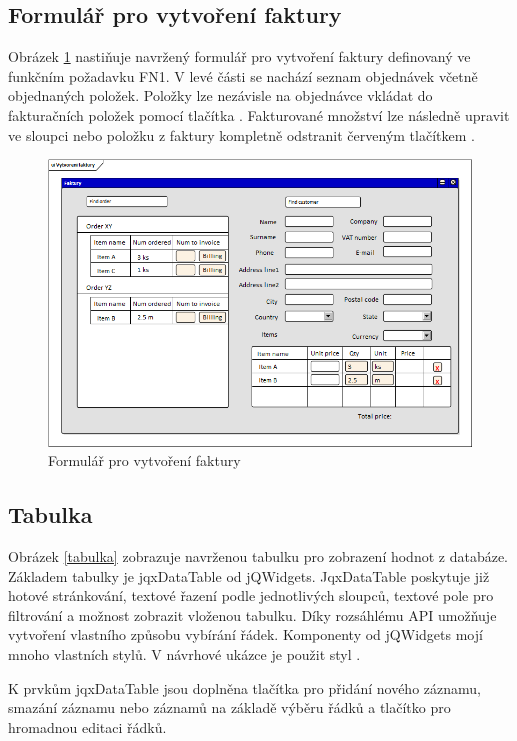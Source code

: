 \documentclass[thesis=B,czech]{FITthesis}[2012/06/26]
\begin{document}
\subsection{Formulář pro vytvoření faktury}
	Obrázek \ref{faktura} nastiňuje navržený formulář pro vytvoření faktury definovaný ve funkčním požadavku FN1. V levé části se nachází seznam objednávek včetně objednaných položek. Položky lze nezávisle na objednávce vkládat do fakturačních položek pomocí tlačítka . Fakturované množství lze následně upravit ve sloupci  nebo položku z faktury kompletně odstranit červeným tlačítkem . 

\begin{figure}
	\includegraphics[width=\textwidth]{invoice_form.png}
	\caption{Formulář pro vytvoření faktury}\label{faktura}
\end{figure}

\subsection{Tabulka}
	Obrázek \ref{tabulka} zobrazuje navrženou tabulku pro zobrazení hodnot z databáze. Základem tabulky je jqxDataTable\cite{jqx_dataTable} od jQWidgets. JqxDataTable poskytuje již hotové stránkování, textové řazení podle jednotlivých sloupců, textové pole pro filtrování a možnost zobrazit vloženou tabulku. Díky rozsáhlému API umožňuje vytvoření vlastního způsobu vybírání řádek. Komponenty od jQWidgets mojí mnoho vlastních stylů. V návrhové ukázce je použit styl .
	
	K prvkům jqxDataTable jsou doplněna tlačítka pro přidání nového záznamu, smazání záznamu nebo záznamů na základě výběru řádků a tlačítko pro hromadnou editaci řádků.
\end{document}
